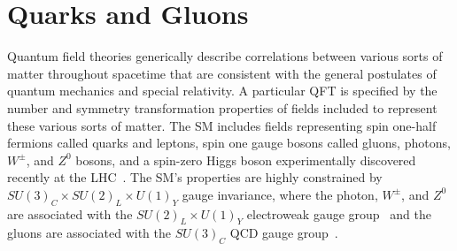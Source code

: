 \section{Quarks and Gluons}\label{sec:qcd}

Quantum field theories generically describe correlations between various sorts of matter throughout spacetime that
are consistent with the general postulates of quantum mechanics and special relativity.
A particular QFT is specified by the number and symmetry transformation properties of fields included to represent these various sorts of matter.
The SM includes fields representing
spin one-half fermions called quarks and leptons,
spin one gauge bosons called gluons, photons, $W^\pm$, and $Z^0$ bosons,
and a spin-zero Higgs boson
experimentally discovered recently at the LHC~\cite{Aad:2012tfa,Chatrchyan:2012xdj}.
The SM's properties are highly constrained by $SU(3)_C\times SU(2)_L\times U(1)_Y$ gauge invariance,
where the photon, $W^\pm$, and $Z^0$ are associated with the $SU(2)_L\times U(1)_Y$ electroweak gauge group~\cite{Glashow:1961tr,Salam:1964ry,Weinberg:1967tq,Glashow:1970gm}
and the gluons are associated with the $SU(3)_C$ QCD gauge group~\cite{Fritzsch:1972jv,Fritzsch:1973pi,Politzer:1973fx,Gross:1973id}.


